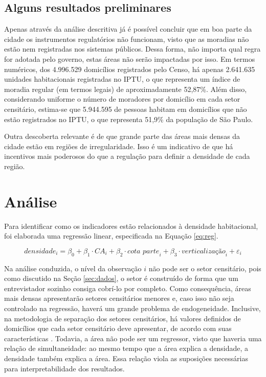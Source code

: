 \clearpage

\section*{Alguns resultados preliminares}

Apenas através da análise descritiva já é possível concluir que em boa parte da cidade os instrumentos regulatórios não funcionam, visto que as moradias não estão nem registradas nos sistemas públicos. Dessa forma, não importa qual regra for adotada pelo governo, estas áreas não serão impactadas por isso. Em termos numéricos, dos 4.996.529 domicílios registrados pelo Censo, há apenas 2.641.635 unidades habitacionais registradas no IPTU, o que representa um índice de moradia regular (em termos legais) de aproximadamente 52,87\%. Além disso, considerando uniforme o número de moradores por domicílio em cada setor censitário, estima-se que 5.944.595 de pessoas habitam em domicílios que não estão registrados no IPTU, o que representa 51,9\% da população de São Paulo.

Outra descoberta relevante é de que grande parte das áreas mais densas da cidade estão em regiões de irregularidade. Isso é um indicativo de que há incentivos mais poderosos do que a regulação para definir a densidade de cada região.



\chapter{Análise}

Para identificar como os indicadores estão relacionados à densidade habitacional, foi elaborada uma regressão linear, especificada na Equação \ref{eq:reg}. 

\begin{equation}
    \textit{densidade}_i = \beta_0 + \beta_1 \cdot \textit{CA}_i + \beta_2 \cdot\textit{cota parte}_i + \beta_3\cdot\textit{verticalização}_i + \varepsilon_i
    \label{eq:reg}
\end{equation}

Na análise conduzida, o nível da observação $i$ não pode ser o setor censitário, pois como discutido na Seção \ref{sec:dados}, o setor é construído de forma que um entrevistador sozinho consiga cobrí-lo por completo. Como consequência, áreas mais densas apresentarão setores censitários menores e, caso isso não seja controlado na regressão, haverá um grande problema de endogeneidade. Inclusive, na metodologia de separação dos setores censitários, há valores definidos de domicílios que cada setor censitário deve apresentar, de acordo com suas características \cite{IBGE2024}. Todavia, a área não pode ser um regressor, visto que haveria uma relação de simultaneidade: ao mesmo tempo que a área explica a densidade, a densidade também explica a área. Essa relação viola as suposições necessárias para interpretabilidade dos resultados.

